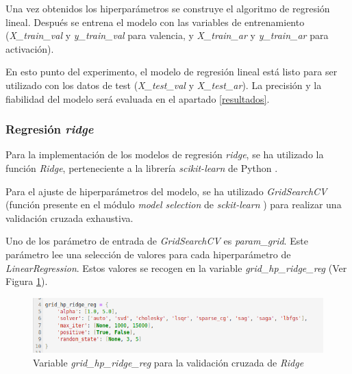 \documentclass[12pt,a4paper,Spanish]{article}
\begin{document}
Una vez obtenidos los hiperparámetros se construye el algoritmo de regresión lineal. Después se entrena el modelo con las variables de entrenamiento (\textit{X\_train\_val} y \textit{y\_train\_val} para valencia, y \textit{X\_train\_ar} y \textit{y\_train\_ar} para activación).
\newline

En esto punto del experimento, el modelo de regresión lineal está listo para ser utilizado con los datos de test (\textit{X\_test\_val} y \textit{X\_test\_ar}). La precisión y la fiabilidad del modelo será evaluada en el apartado \ref{resultados}.

\subsubsection{Regresión \textit{ridge}}
Para la implementación de los modelos de regresión \textit{ridge}, se ha utilizado la función \textit{Ridge}, perteneciente a la librería \textit{scikit-learn} de Python \cite{scikit-learn}.
\newline

Para el ajuste de hiperparámetros del modelo, se ha utilizado \textit{GridSearchCV} (función presente en el módulo \textit{model selection} de \textit{sckit-learn} \cite{scikit-learn}) para realizar una validación cruzada exhaustiva.

Uno de los parámetro de entrada de \textit{GridSearchCV} es \textit{param\_grid}. Este parámetro lee una selección de valores para cada hiperparámetro de \textit{LinearRegression}. Estos valores se recogen en la variable \textit{grid\_hp\_ridge\_reg} (Ver Figura \ref{fig:paramsridge}).
\begin{figure}[H]
	\centering
	\includegraphics[width=0.7\linewidth]{figs/params_ridge}
	\caption{Variable \textit{grid\_hp\_ridge\_reg} para la validación cruzada de \textit{Ridge}}
	\label{fig:paramsridge}
\end{figure}
\end{document}
